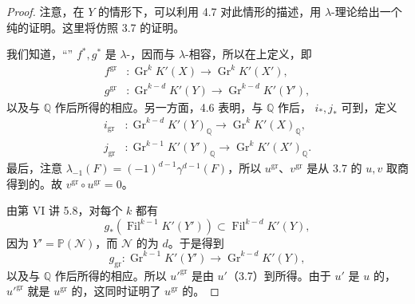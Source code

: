 \begin{proof}
注意，在 $Y$ 的情形下，可以利用 4.7 对此情形的描述，用 $\lambda$-理论给出一个纯的证明。这里将仿照 3.7 的证明。

我们知道，“” $f^*,g^*$ 是 $\lambda$-，因而与 $\lambda$-相容，所以在上定义，即
\[
\begin{aligned}
f^{\mathrm{gr}}&:\operatorname{Gr}^kK'(X)\longrightarrow\operatorname{Gr}^kK'(X'),\\
g^{\mathrm{gr}}&:\operatorname{Gr}^{k-d}K'(Y)\longrightarrow\operatorname{Gr}^{k-d}K'(Y'),
\end{aligned}
\]
以及与 $\mathbb Q$ 作后所得的相应。另一方面，4.6 表明，与 $\mathbb Q$ 作后， $i_*,j_*$ 可到，定义
\[
\begin{aligned}
i_{\mathrm{gr}}&:\operatorname{Gr}^{k-d}K'(Y)_{\mathbb Q}\longrightarrow\operatorname{Gr}^kK'(X)_{\mathbb Q},\\
j_{\mathrm{gr}}&:\operatorname{Gr}^{k-1}K'(Y')_{\mathbb Q}\longrightarrow\operatorname{Gr}^kK'(X')_{\mathbb Q}.
\end{aligned}
\]
最后，注意 $\lambda_{-1}(F)=(-1)^{d-1}\gamma^{d-1}(F)$，所以 $u^{\mathrm{gr}}$、$v^{\mathrm{gr}}$ 是从 3.7 的 $u,v$ 取商得到的。故 $v^{\mathrm{gr}}\circ u^{\mathrm{gr}}=0$。

由第 VI 讲 5.8，对每个 $k$ 都有
\[
g_*(\operatorname{Fil}^{k-1}K'(Y'))\subset\operatorname{Fil}^{k-d}K'(Y),
\]
因为 $Y'=\mathbb P(\mathcal N)$，而 $\mathcal N$ 的为 $d$。于是得到
\[
g_{\mathrm{gr}}:\operatorname{Gr}^{k-1}K'(Y')\longrightarrow\operatorname{Gr}^{k-d}K'(Y),
\]
以及与 $\mathbb Q$ 作后所得的相应。所以 $u'^{\mathrm{gr}}$ 是由 $u'$（3.7）到所得。由于 $u'$ 是 $u$ 的，$u'^{\mathrm{gr}}$ 就是 $u^{\mathrm{gr}}$ 的，这同时证明了 $u^{\mathrm{gr}}$ 的。


\end{proof}
